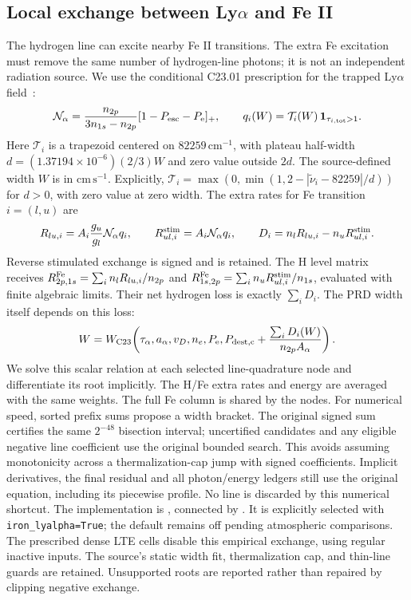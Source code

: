 \documentclass[10pt,a4paper]{article}
\begin{document}
\subsection{\texorpdfstring{Local exchange between Ly$\alpha$ and Fe II}{Local exchange between Ly-alpha and Fe II}}
The hydrogen line can excite nearby Fe II transitions. The extra Fe
excitation must remove the same number of hydrogen-line photons; it is not
an independent radiation source. We use the conditional C23.01 prescription
for the trapped Ly$\alpha$ field~\cite{cloudy}:
\begin{equation}
 \mathcal{N}_{\alpha}=
 \frac{n_{2p}}{3n_{1s}-n_{2p}}
 [1-P_{\rm esc}-P_{\rm e}]_+,
 \qquad
 q_i(W)=\mathcal{T}_i(W)\,\mathbf{1}_{\tau_{i,\rm tot}>1}.
 \label{eq:iron_field}
\end{equation}
Here $\mathcal{T}_i$ is a trapezoid centered on $82259\,\mathrm{cm}^{-1}$,
with plateau half-width $d=(1.37194\times10^{-6})(2/3)W$ and zero value
outside $2d$. The source-defined width $W$ is in $\mathrm{cm\,s^{-1}}$. Explicitly,
$\mathcal{T}_i=\max(0,\min(1,2-|\tilde{\nu}_i-82259|/d))$ for $d>0$,
with zero value at zero width.
The extra rates for Fe transition $i=(l,u)$ are
\begin{equation}
 R_{lu,i}=A_i\frac{g_u}{g_l}\mathcal{N}_{\alpha}q_i,
 \qquad
 R_{ul,i}^{\rm stim}=A_i\mathcal{N}_{\alpha}q_i,
 \qquad
 D_i=n_lR_{lu,i}-n_uR_{ul,i}^{\rm stim}.
 \label{eq:iron_exchange}
\end{equation}
Reverse stimulated exchange is signed and is retained. The H level matrix
receives $R_{2p,1s}^{\rm Fe}=\sum_i n_lR_{lu,i}/n_{2p}$ and
$R_{1s,2p}^{\rm Fe}=\sum_i n_uR_{ul,i}^{\rm stim}/n_{1s}$, evaluated with
finite algebraic limits. Their net hydrogen loss is exactly $\sum_iD_i$.
The PRD width itself depends on this loss:
\begin{equation}
 W=W_{\rm C23}\!\left(\tau_\alpha,a_\alpha,v_D,n_e,
    P_{\rm e},P_{\rm dest,c}+
    \frac{\sum_iD_i(W)}{n_{2p}A_\alpha}\right).
 \label{eq:iron_width}
\end{equation}
We solve this scalar relation at each selected line-quadrature node and
differentiate its root implicitly. The H/Fe extra rates and energy are
averaged with the same weights. The full Fe column is shared by the nodes.
For numerical speed, sorted prefix sums propose a width bracket. The
original signed sum certifies the same $2^{-48}$ bisection interval;
uncertified candidates and any eligible negative line coefficient use the
original bounded search. This avoids assuming monotonicity across a
thermalization-cap jump with signed coefficients. Implicit derivatives,
the final residual and all photon/energy ledgers still use the original
equation, including its piecewise profile. No line is discarded by this
numerical shortcut.
The implementation is ,
connected by .
It is explicitly selected with \texttt{iron\_lyalpha=True}; the default
remains off pending atmospheric comparisons. The prescribed dense LTE
cells disable this empirical exchange, using regular inactive inputs. The source's static width fit, thermalization cap,
and thin-line
guards are retained. Unsupported roots are reported rather than repaired by
clipping negative exchange.
\end{document}
